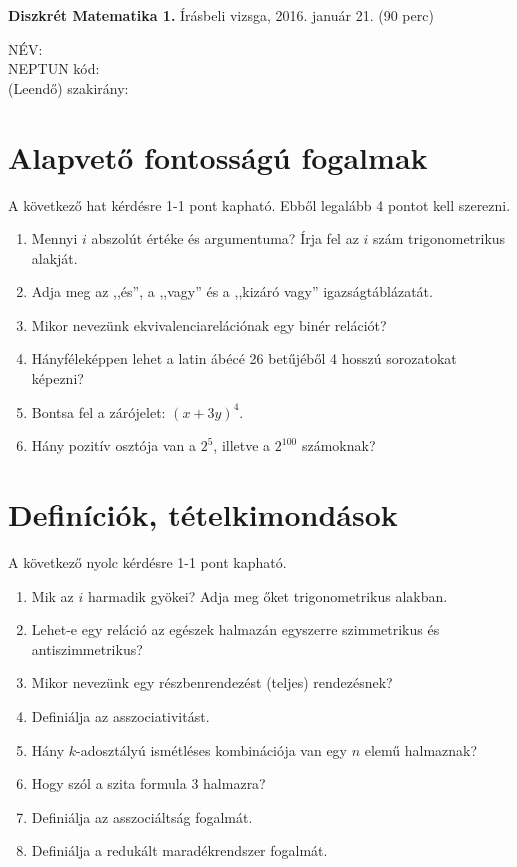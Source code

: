 \documentclass[11pt,a4paper]{article}
\begin{document}
\thispagestyle{empty}

\begin{center}
\begin{large}
\noindent \textbf{Diszkrét Matematika 1.} Írásbeli vizsga, 2016. január 21. (90 perc)
\end{large}
\end{center}

{\noindent NÉV: \\ NEPTUN kód:\\ (Leendő) szakirány:\\}
\section{Alapvető fontosságú fogalmak}
A következő hat kérdésre 1-1 pont kapható. Ebből legalább 4 pontot kell szerezni.
\begin{enumerate}\setlength{\itemsep}{3cm}

\item Mennyi $i$ abszolút értéke és argumentuma? Írja fel az $i$ szám trigonometrikus alakját.
\item Adja meg az ,,és'', a ,,vagy'' és a ,,kizáró vagy'' igazságtáblázatát.\vspace{1.5cm}
\item Mikor nevezünk ekvivalenciarelációnak egy binér relációt?\vspace{-1.5cm}
\item Hányféleképpen lehet a latin ábécé 26 betűjéből 4 hosszú sorozatokat képezni?\vspace{-1.5cm}
\item Bontsa fel a zárójelet: $(x+3y)^4$. 
\item Hány pozitív osztója van a $2^5$, illetve a $2^{100}$ számoknak?
\end{enumerate}

\newpage
\section{Definíciók, tételkimondások}
A következő nyolc kérdésre 1-1 pont kapható. 
\begin{enumerate}\setlength{\itemsep}{2.2cm}

\item Mik az $i$ harmadik gyökei? Adja meg őket trigonometrikus alakban.
\item Lehet-e egy reláció az egészek halmazán egyszerre szimmetrikus és antiszimmetrikus?
\item Mikor nevezünk egy részbenrendezést (teljes) rendezésnek?
\item Definiálja az asszociativitást.
\item Hány $k$-adosztályú ismétléses kombinációja van egy $n$ elemű halmaznak?
\item Hogy szól a szita formula 3 halmazra?
\item Definiálja az asszociáltság fogalmát.
\item Definiálja a redukált maradékrendszer fogalmát.



\end{enumerate}
\end{document}
